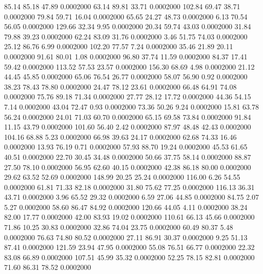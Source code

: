   85.14   85.18   47.89   0.0002000
  63.14   89.81   33.71   0.0002000
 102.84   69.47   38.71   0.0002000
  79.84   59.71   16.04   0.0002000
  65.65   24.27   48.73   0.0002000
   6.13   70.54   56.05   0.0002000
 129.66   32.34    9.95   0.0002000
  20.34   59.74   43.03   0.0002000
  31.84   79.88   39.23   0.0002000
  62.24   83.09   31.76   0.0002000
   3.46   51.75   74.03   0.0002000
  25.12   86.76    6.99   0.0002000
 102.20   77.57    7.24   0.0002000
  35.46   21.89   20.11   0.0002000
  91.61   80.01    1.08   0.0002000
  96.80   37.74   11.59   0.0002000
  84.37   17.41   59.42   0.0002000
 113.52   57.53   23.57   0.0002000
 156.30   68.69    4.98   0.0002000
  21.12   44.45   45.85   0.0002000
  65.06   76.54   26.77   0.0002000
  58.07   56.90    0.92   0.0002000
  38.23   78.43   78.80   0.0002000
  24.47   78.12   23.61   0.0002000
  66.48   64.91   74.08   0.0002000
  75.76   89.18   71.34   0.0002000
  27.77   28.12   17.72   0.0002000
  44.36   54.15    7.14   0.0002000
  43.04   72.47    0.93   0.0002000
  73.36   50.26    9.24   0.0002000
  15.81   63.78   56.24   0.0002000
  24.01   71.03   60.70   0.0002000
  65.15   69.58   73.84   0.0002000
  91.84   11.15   43.79   0.0002000
 101.60   56.40    2.42   0.0002000
  87.97   48.48   42.43   0.0002000
 104.16   68.88    5.23   0.0002000
  66.98   39.63   24.17   0.0002000
  62.68   74.33   16.46   0.0002000
  13.93   76.19    0.71   0.0002000
  57.93   88.70   19.24   0.0002000
  45.53   61.65   40.51   0.0002000
  22.70   30.45   34.48   0.0002000
  50.66   37.75   58.14   0.0002000
  88.87   27.50   78.10   0.0002000
  56.95   62.60   40.15   0.0002000
  42.38   86.18   80.00   0.0002000
  29.62   63.52   52.69   0.0002000
 148.99   20.25   25.24   0.0002000
 116.00    6.26   54.55   0.0002000
  61.81   71.33   82.18   0.0002000
  31.80   75.62   77.25   0.0002000
 116.13   36.31   43.71   0.0002000
   3.96   65.52   29.32   0.0002000
   6.59   27.06   44.85   0.0002000
  84.75    2.07    5.27   0.0002000
  58.60   86.47   84.92   0.0002000
 120.66   44.05    4.11   0.0002000
  38.24   82.00   17.77   0.0002000
  42.00   83.93   19.02   0.0002000
 110.61   66.13   45.66   0.0002000
  71.86   10.25   30.83   0.0002000
  32.86   74.04   23.75   0.0002000
  60.49   80.37    5.48   0.0002000
  76.63   74.80   80.52   0.0002000
  27.11   86.91   30.37   0.0002000
   9.25   51.13   87.41   0.0002000
 121.59   23.94   47.95   0.0002000
  55.08   76.51   66.77   0.0002000
  22.32   83.08   66.89   0.0002000
 107.51   45.99   35.32   0.0002000
  52.25   78.15   82.81   0.0002000
  71.60   86.31   78.52   0.0002000
